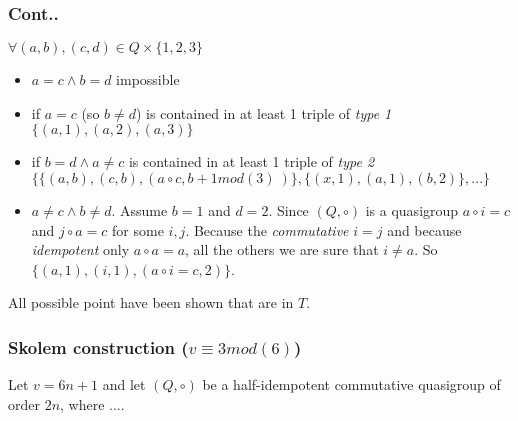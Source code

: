 \begin{frame}
\frametitle{Cont..}
$\forall (a,b),(c,d) \in Q \times \{1,2,3\}$
\begin{itemize}
	\item $a=c \wedge b=d$ impossible
	\item if $a=c$ (so $b\not = d$) is contained in at least 1 triple of \textit{type 1} $\{(a,1),(a,2),(a,3)\}$
	\item if $b=d \wedge a \not = c$ is contained in at least 1 triple of \textit{type 2} $\{\{(a,b),(c,b),(a \circ c, b+1 mod(3)\ )\}, \{(x,1),(a,1),(b,2)\}, ... \}$
	\item $a \not = c \wedge b \not = d$.%
	Assume $b=1$ and $d=2$. Since $(Q,\circ)$ is a quasigroup $a \circ i = c$ and $j \circ a = c$ for some $i,j$. Because the \textit{commutative} $i=j$ and because \textit{idempotent} only $a \circ a=a$, all the others we are sure that $i\not = a$. So $\{(a,1),(i,1),(a \circ i = c, 2)\}$.
\end{itemize}

All possible point have been shown that are in $T$.
\end{frame}

\begin{frame}
\frametitle{Skolem construction ($v \equiv 3 mod(6)$)}
Let $v = 6n +1$ and let $(Q, \circ)$ be a half-idempotent commutative quasigroup of order $2n$, where ....
\end{frame}



